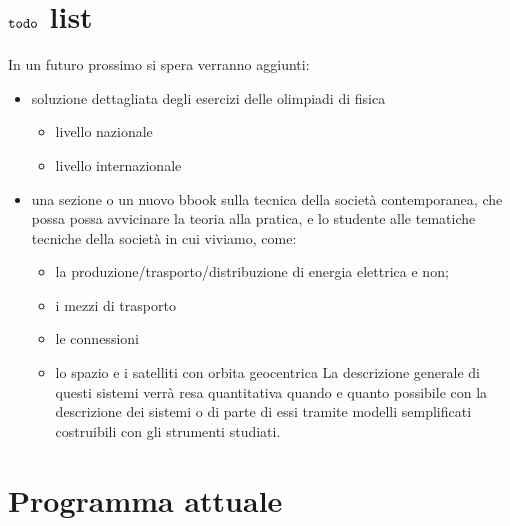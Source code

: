 \documentclass[letterpaper,10pt,italian]{jupyterBook}
\begin{document}
\section{\protect\(\texttt{todo}\protect\) list}
\label{\detokenize{ch/program:texttt-todo-list}}
\sphinxAtStartPar
In un futuro prossimo \sphinxhyphen{} si spera \sphinxhyphen{} verranno aggiunti:
\begin{itemize}
\item {} 
\sphinxAtStartPar
soluzione dettagliata degli esercizi delle olimpiadi di fisica
\begin{itemize}
\item {} 
\sphinxAtStartPar
livello nazionale

\item {} 
\sphinxAtStartPar
livello internazionale%
\begin{footnote}[1]\sphinxAtStartFootnote
{}
%
\end{footnote}

\end{itemize}

\item {} 
\sphinxAtStartPar
una sezione \sphinxhyphen{} o un nuovo bbook \sphinxhyphen{} sulla tecnica della società contemporanea, che possa possa avvicinare la teoria alla pratica, e lo studente alle tematiche tecniche della società in cui viviamo,  come:
\begin{itemize}
\item {} 
\sphinxAtStartPar
la produzione/trasporto/distribuzione di energia elettrica e non;

\item {} 
\sphinxAtStartPar
i mezzi di trasporto

\item {} 
\sphinxAtStartPar
le connessioni

\item {} 
\sphinxAtStartPar
lo spazio e i satelliti con orbita geocentrica
La descrizione generale di questi sistemi verrà resa quantitativa quando e quanto possibile con la descrizione dei sistemi o di parte di essi tramite modelli semplificati costruibili con gli strumenti studiati.

\end{itemize}

\end{itemize}


\section{Programma attuale}
\label{\detokenize{ch/program:programma-attuale}}
\end{document}
